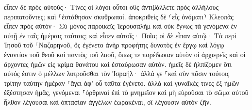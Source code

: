 \documentclass{openreader}
\begin{document}
εἶπεν δὲ πρὸς αὐτούς· Τίνες οἱ λόγοι οὗτοι οὓς ἀντιβάλλετε πρὸς ἀλλήλους περιπατοῦντες; καὶ ⸀ἐστάθησαν σκυθρωποί. 
ἀποκριθεὶς δὲ ⸂εἷς ὀνόματι⸃ Κλεοπᾶς εἶπεν πρὸς αὐτόν· Σὺ μόνος παροικεῖς Ἰερουσαλὴμ καὶ οὐκ ἔγνως τὰ γενόμενα ἐν αὐτῇ ἐν ταῖς ἡμέραις ταύταις; 
καὶ εἶπεν αὐτοῖς· Ποῖα; οἱ δὲ εἶπαν αὐτῷ· Τὰ περὶ Ἰησοῦ τοῦ ⸀Ναζαρηνοῦ, ὃς ἐγένετο ἀνὴρ προφήτης δυνατὸς ἐν ἔργῳ καὶ λόγῳ ἐναντίον τοῦ θεοῦ καὶ παντὸς τοῦ λαοῦ, 
ὅπως τε παρέδωκαν αὐτὸν οἱ ἀρχιερεῖς καὶ οἱ ἄρχοντες ἡμῶν εἰς κρίμα θανάτου καὶ ἐσταύρωσαν αὐτόν. 
ἡμεῖς δὲ ἠλπίζομεν ὅτι αὐτός ἐστιν ὁ μέλλων λυτροῦσθαι τὸν Ἰσραήλ· ἀλλά γε ⸀καὶ σὺν πᾶσιν τούτοις τρίτην ταύτην ἡμέραν ⸀ἄγει ἀφ’ οὗ ταῦτα ἐγένετο. 
ἀλλὰ καὶ γυναῖκές τινες ἐξ ἡμῶν ἐξέστησαν ἡμᾶς, γενόμεναι ⸀ὀρθριναὶ ἐπὶ τὸ μνημεῖον 
καὶ μὴ εὑροῦσαι τὸ σῶμα αὐτοῦ ἦλθον λέγουσαι καὶ ὀπτασίαν ἀγγέλων ἑωρακέναι, οἳ λέγουσιν αὐτὸν ζῆν. 
\end{document}
